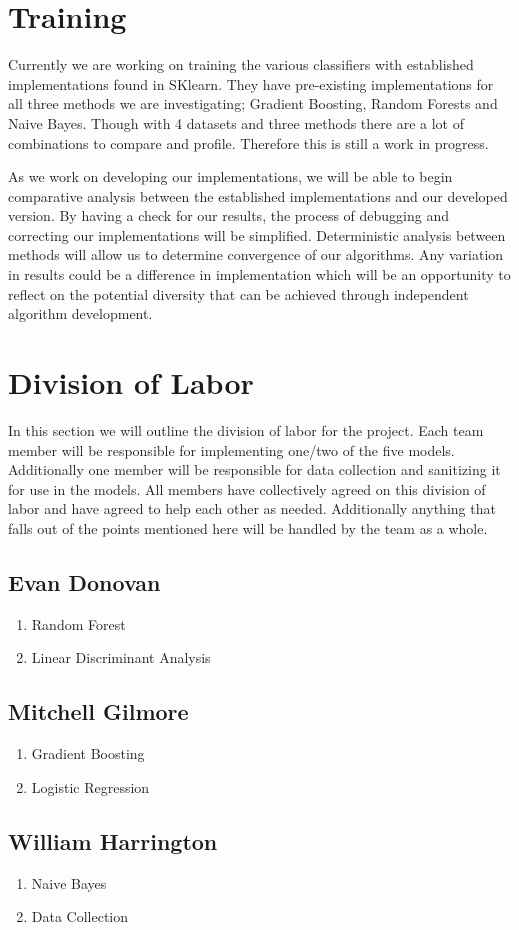 \documentclass[10pt,twocolumn,letterpaper]{article}
\begin{document}
\section{Training}

Currently we are working on training the various classifiers with established implementations found in SKlearn.
They have pre-existing implementations for all three methods we are investigating; Gradient Boosting, Random Forests and Naive Bayes.
Though with 4 datasets and three methods there are a lot of combinations to compare and profile.
Therefore this is still a work in progress.

As we work on developing our implementations, we will be able to begin comparative analysis between the established implementations and our developed version.
By having a check for our results, the process of debugging and correcting our implementations will be simplified.
Deterministic analysis between methods will allow us to determine convergence of our algorithms.
Any variation in results could be a difference in implementation which will be an opportunity to reflect on the potential diversity that can be achieved through independent algorithm development.


\section{Division of Labor}

In this section we will outline the division of labor for the project.
Each team member will be responsible for implementing one/two of the five models.
Additionally one member will be responsible for data collection and sanitizing it for use in the models.
All members have collectively agreed on this division of labor and have agreed to help each other as needed.
Additionally anything that falls out of the points mentioned here will be handled by the team as a whole.

\subsection{Evan Donovan}
\begin{enumerate}
  \item Random Forest
  \item Linear Discriminant Analysis
\end{enumerate}

\subsection{Mitchell Gilmore}
\begin{enumerate}
  \item Gradient Boosting
  \item Logistic Regression
\end{enumerate}

\subsection{William Harrington}
\begin{enumerate}
  \item Naive Bayes
  \item Data Collection
\end{enumerate}

{
  \small
  
  
}
\end{document}
